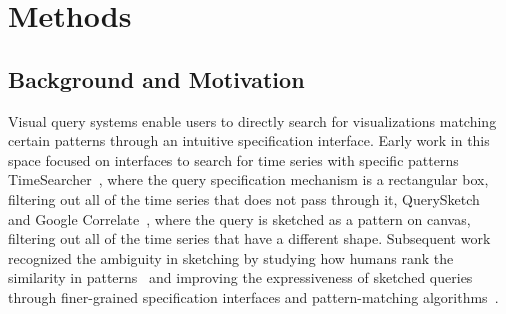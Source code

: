 \section{Methods\label{sec:methods}}
\subsection{Background and Motivation}
\par Visual query systems enable users to directly search for visualizations matching certain patterns through an intuitive specification interface. Early work in this space focused on interfaces to search for time series with specific patterns TimeSearcher~\cite{Hochheiser2001,Hochheiser2004}, where the query specification mechanism is a rectangular box,  filtering out all of the time series that does not pass through it, QuerySketch~\cite{wattenberg2001sketching} and Google Correlate~\cite{mohebbi2011google}, where the query is sketched as a pattern on canvas,  filtering out all of the time series that have a different shape. Subsequent work recognized the ambiguity in sketching by studying how humans rank the similarity in patterns~\cite{Eichmann2015,correll2016semantics,Mannino2018} and improving the expressiveness of sketched queries through finer-grained specification interfaces and pattern-matching algorithms~\cite{ryall2005querylines,Holz2009}.
